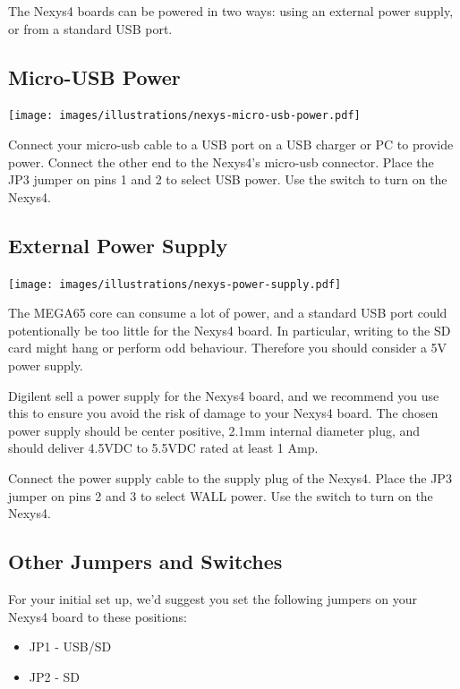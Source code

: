 The Nexys4 boards can be powered in two ways: using an external power supply, or from a standard USB port.

\subsection{Micro-USB Power}

\texttt{[image: images/illustrations/nexys-micro-usb-power.pdf]}

Connect your micro-usb cable to a USB port on a USB charger or PC to provide power. Connect the other end to the Nexys4's micro-usb connector. Place the JP3 jumper on pins 1 and 2 to select USB power. Use the switch to turn on the Nexys4.

\subsection{External Power Supply}

\hspace*{1.7cm}
\texttt{[image: images/illustrations/nexys-power-supply.pdf]}

The MEGA65 core can consume a lot of power, and a standard USB port could potentionally be too little for the Nexys4 board. In particular, writing to the SD card might hang or perform odd behaviour. Therefore you should consider a 5V power supply.

Digilent sell a power supply for the Nexys4 board, and we recommend you use this to ensure you avoid the risk of damage to your Nexys4 board. The chosen power supply should be center positive, 2.1mm internal diameter plug, and should deliver 4.5VDC to 5.5VDC rated at least 1 Amp.

Connect the power supply cable to the supply plug of the Nexys4. Place the JP3 jumper on pins 2 and 3 to select WALL power. Use the switch to turn on the Nexys4.

\subsection{Other Jumpers and Switches}

For your initial set up, we'd suggest you set the following jumpers on your Nexys4 board to these positions:

\begin{itemize}
  \item{JP1} - USB/SD
  \item{JP2} - SD
\end{itemize}

